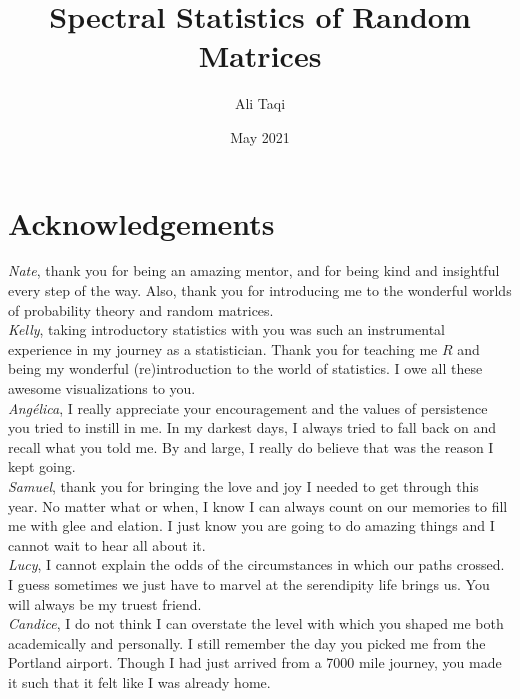 \documentclass[12pt,twoside]{reedthesis}
\title{Spectral Statistics of Random Matrices}
\author{Ali Taqi}
\date{May 2021}
\newcommand{\achknowledge}[1]{\noindent \textit{#1},}
\begin{document}
  \maketitle
  \frontmatter %
  \pagestyle{empty} %

     \chapter*{Acknowledgements}

	\achknowledge{Nate} thank you for being an amazing mentor, and for being kind and insightful every step of the way.
	Also, thank you for introducing me to the wonderful worlds of probability theory and random matrices. \\

	\achknowledge{Kelly} taking introductory statistics with you was such an instrumental experience in my journey as a statistician.
  Thank you for teaching me $R$ and being my wonderful (re)introduction to the world of statistics.
	I owe all these awesome visualizations to you. \\

	\achknowledge{Ang\'elica} I really appreciate your encouragement and the values of persistence you tried to instill in me.
  In my darkest days, I always tried to fall back on and recall what you told me.
  By and large, I really do believe that was the reason I kept going. \\

	\achknowledge{Samuel} thank you for bringing the love and joy I needed to get through this year.
  No matter what or when, I know I can always count on our memories to fill me with glee and elation.
	I just know you are going to do amazing things and I cannot wait to hear all about it. \\

  \achknowledge{Lucy} I cannot explain the odds of the circumstances in which our paths crossed.
  I guess sometimes we just have to marvel at the serendipity life brings us.
  You will always be my truest friend. \\

  \achknowledge{Candice} I do not think I can overstate the level with which you shaped me both academically and personally.
  I still remember the day you picked me from the Portland airport.
	Though I had just arrived from a 7000 mile journey, you made it such that it felt like I was already home.  \\
\end{document}
